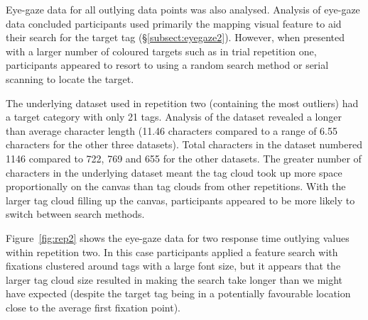 Eye-gaze data for all outlying data points was also analysed.  Analysis of eye-gaze data concluded participants used primarily the mapping visual feature to aid their search for the target tag (\S\ref{subsect:eyegaze2}). However, when presented with a larger number of coloured targets such as in trial repetition one, participants appeared to resort to using a random search method or serial scanning to locate the target. 

The underlying dataset used in repetition two (containing the most outliers) had a target category with only 21 tags. Analysis of the dataset revealed a longer than average character length (11.46 characters compared to a range of 6.55 characters for the other three datasets). Total characters in the dataset numbered 1146 compared to 722, 769 and 655 for the other datasets. The greater number of characters in the underlying dataset meant the tag cloud took up more space proportionally on the canvas than tag clouds from other repetitions. With the larger tag cloud filling up the canvas, participants appeared to be more likely to switch between search methods. 

Figure~\vref{fig:rep2} shows the eye-gaze data for two response time outlying values within repetition two. In this case participants applied a feature search with fixations clustered around tags with a large font size, but it appears that the larger tag cloud size resulted in making the search take longer than we might have expected (despite the target tag being in a potentially favourable location close to the average first fixation point). 


